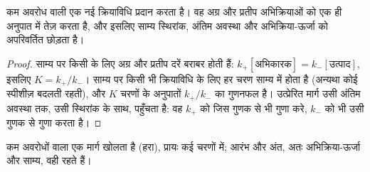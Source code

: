 \begin{proposition}[उत्प्रेरक क्या बदलता है]\label{prop:b1:elementary-steps:catalysis}
 कम अवरोध वाली एक नई क्रियाविधि प्रदान करता है। वह
अग्र और प्रतीप अभिक्रियाओं को एक ही अनुपात में तेज़ करता है, और इसलिए
साम्य स्थिरांक, अंतिम अवस्था और अभिक्रिया-ऊर्जा को
अपरिवर्तित छोड़ता है।
\end{proposition}

\begin{proof}
साम्य पर किसी  के लिए अग्र और प्रतीप दरें
बराबर होती हैं: $k_+[\text{अभिकारक}] = k_-[\text{उत्पाद}]$, इसलिए $K = k_+/k_-$।
साम्य पर किसी भी क्रियाविधि के लिए हर चरण साम्य में होता है (अन्यथा
कोई स्पीशीज़ बदलती रहती), और $K$ चरणों के अनुपातों $k_+/k_-$ का
गुणनफल है। उत्प्रेरित मार्ग उसी अंतिम अवस्था तक, उसी स्थिरांक के साथ,
पहुँचता है: वह $k_+$ को जिस गुणक से भी गुणा करे, $k_-$ को
भी उसी गुणक से गुणा करता है।
\end{proof}

\begin{omfigure}

{\small {} कम अवरोधों वाला एक मार्ग खोलता है (हरा), प्रायः
कई चरणों में; आरंभ और अंत, अतः अभिक्रिया-ऊर्जा और
साम्य, वही रहते हैं।}
\end{omfigure}

